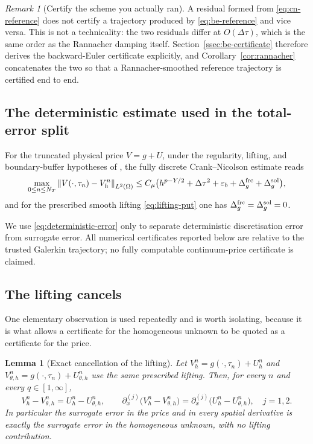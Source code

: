 \documentclass[11pt]{amsart}
\newtheorem{lemma}[theorem]{Lemma}
\theoremstyle{remark}
\newtheorem{remark}[theorem]{Remark}
\newcommand{\norm}[1]{\left\lVert #1\right\rVert}
\newcommand{\dt}{\Delta\tau}
\begin{document}
\begin{remark}[Certify the scheme you actually ran]
\label{rem:certify-what-you-ran}
A residual formed from \eqref{eq:cn-reference} does not certify a trajectory
produced by \eqref{eq:be-reference} and vice versa.  This is not a technicality:
the two residuals differ at $O(\dt)$, which is the same order as the
Rannacher damping itself.  Section~\ref{ssec:be-certificate} therefore derives
the backward-Euler certificate explicitly, and
Corollary~\ref{cor:rannacher} concatenates the two so that a Rannacher-smoothed
reference trajectory is certified end to end.
\end{remark}

\subsection{The deterministic estimate used in the total-error split}
\label{ssec:deterministic-error}

For the truncated physical price $V=g+U$, under the regularity, lifting, and
boundary-buffer hypotheses of \cite{DamircheliCGMY2026}, the fully discrete
Crank--Nicolson estimate reads
\begin{equation}
 \max_{0\le n\le N_T}\norm{V(\cdot,\tau_n)-V_h^n}_{L^2(\Omega)}
 \le C_\mu\bigl(
 h^{p-Y/2}+\dt^2+\varepsilon_b+\Delta_g^{\rm frc}+\Delta_g^{\rm sol}
 \bigr),
 \label{eq:deterministic-error}
\end{equation}
and for the prescribed smooth lifting \eqref{eq:lifting-put} one has
$\Delta_g^{\rm frc}=\Delta_g^{\rm sol}=0$.

We use \eqref{eq:deterministic-error} only to separate deterministic
discretisation error from surrogate error.  All numerical certificates
reported below are relative to the trusted Galerkin trajectory; no fully
computable continuum-price certificate is claimed.

\subsection{The lifting cancels}
\label{ssec:lifting-cancels}

One elementary observation is used repeatedly and is worth isolating, because
it is what allows a certificate for the homogeneous unknown to be quoted as a
certificate for the price.

\begin{lemma}[Exact cancellation of the lifting]
\label{lem:lifting-cancels}
Let $V_h^n=g(\cdot,\tau_n)+U_h^n$ and
$V_{\theta,h}^n=g(\cdot,\tau_n)+U_{\theta,h}^n$ use the \emph{same} prescribed
lifting.  Then, for every $n$ and every $q\in[1,\infty]$,
\begin{equation}
  V_h^n-V_{\theta,h}^n=U_h^n-U_{\theta,h}^n,
  \qquad
  \partial_x^{(j)}\bigl(V_h^n-V_{\theta,h}^n\bigr)
  =\partial_x^{(j)}\bigl(U_h^n-U_{\theta,h}^n\bigr),
  \quad j=1,2 .
  \label{eq:lifting-cancels}
\end{equation}
In particular the surrogate error in the price and in every spatial derivative
is exactly the surrogate error in the homogeneous unknown, with no lifting
contribution.
\end{lemma}
\end{document}
